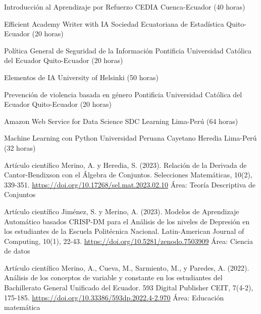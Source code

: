 \documentclass[
	a4paper,
	maincolor=cvblue!70!blue,
	sidecolor=gray!30,
	sectioncolor=cvblue!70!blue,
    sidebarwidth=7.5cm,
	topbottommargin=20pt,
	leftrightmargin=20pt,
]{fortysecondscv}
\begin{document}

    {Introducción al Aprendizaje por Refuerzo}
    {CEDIA}
    {Cuenca-Ecuador (40 horas)}

    {Efficient Academy Writer with IA}
    {Sociedad Ecuatoriana de Estadística}
    {Quito-Ecuador (20 horas)}

    {Política General de Seguridad de la Información}
    {Pontificia Universidad Católica del Ecuador}
    {Quito-Ecuador (20 horas)}

    {Elementos de IA}
    {University of Helsinki}
    {(50 horas)}

    {Prevención de violencia basada en género}
    {Pontificia Universidad Católica del Ecuador}
    {Quito-Ecuador (20 horas)}

    {Amazon Web Service for Data Science}
    {SDC Learning}
    {Lima-Perú (64 horas)}

    {Machine Learning con Python}
    {Universidad Peruana Cayetano Heredia}
    {Lima-Perú (32 horas)}




    {Artículo científico}
    {Merino, A. y Heredia, S. (2023). Relación de la Derivada de Cantor-Bendixson con el Álgebra de Conjuntos. Selecciones Matemáticas, 10(2), 339-351.}
    {\url{https://doi.org/10.17268/sel.mat.2023.02.10}}
    {Área: Teoría Descriptiva de Conjuntos}
    
    {Artículo científico}
    {Jiménez, S. y Merino, A. (2023). Modelos de Aprendizaje Automático basados CRISP-DM para el Análisis de los niveles de Depresión en los estudiantes de la Escuela Politécnica Nacional. Latin-American Journal of Computing, 10(1), 22-43.}     
    {\url{https://doi.org/10.5281/zenodo.7503909}}
    {Área: Ciencia de datos}
    
    {Artículo científico}
    {Merino, A., Cueva, M., Sarmiento, M., y Paredes, A. (2022). Análisis de los conceptos de variable y constante en los estudiantes del Bachillerato General Unificado del Ecuador. 593 Digital Publisher CEIT, 7(4-2), 175-185.}     
    {\url{https://doi.org/10.33386/593dp.2022.4-2.970}}
    {Área: Educación matemática}
    
\end{document}
